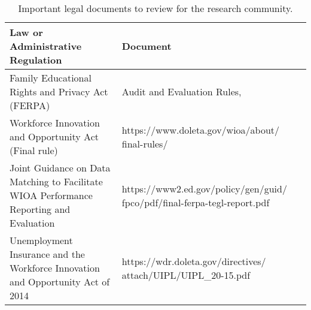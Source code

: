 \begin{table}[t]
\caption{\label{tab:oldatable3}Important legal documents to review for the research community.}\vspace{-2pt}
\footnotesize %
\begin{tabularx}{1\textwidth}{YY}
\toprule
Law or Administrative Regulation & Document\\
\midrule
Family Educational Rights and Privacy Act (FERPA) & Audit and Evaluation Rules,  \cite{privacytechnicalassistancecenter2017}\\
Workforce Innovation and Opportunity Act (Final rule) & https://www.doleta.gov/wioa/about/ final-rules/\\
Joint Guidance on Data Matching to Facilitate WIOA Performance Reporting and Evaluation & https://www2.ed.gov/policy/gen/guid/ fpco/pdf/final-ferpa-tegl-report.pdf\\
Unemployment Insurance and the Workforce Innovation and Opportunity Act of 2014 & https://wdr.doleta.gov/directives/ attach/UIPL/UIPL\_20-15.pdf\\
\bottomrule
\end{tabularx}
\end{table}
